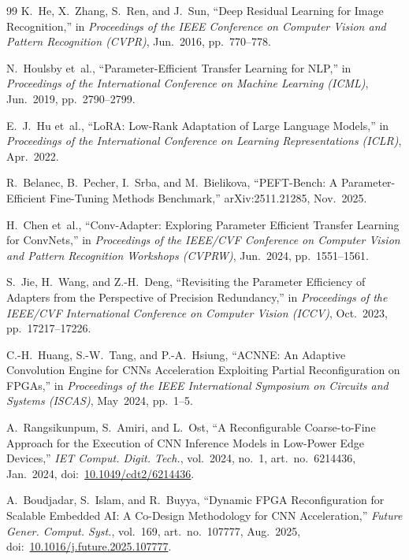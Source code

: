 \documentclass[12pt, a4paper]{report}
\numberwithin{equation}{chapter}
\numberwithin{figure}{chapter}
\numberwithin{table}{chapter}
\numberwithin{algorithm}{chapter}
\begin{document}
\begin{thebibliography}{99}
K.~He, X.~Zhang, S.~Ren, and J.~Sun,
``Deep Residual Learning for Image Recognition,''
in \emph{Proceedings of the IEEE Conference on Computer Vision and Pattern Recognition (CVPR)}, Jun.~2016, pp.~770--778.


N.~Houlsby et~al.,
``Parameter-Efficient Transfer Learning for NLP,''
in \emph{Proceedings of the International Conference on Machine Learning (ICML)}, Jun.~2019, pp.~2790--2799.


E.~J.~Hu et~al.,
``LoRA: Low-Rank Adaptation of Large Language Models,''
in \emph{Proceedings of the International Conference on Learning Representations (ICLR)}, Apr.~2022.


R.~Belanec, B.~Pecher, I.~Srba, and M.~Bielikova,
``PEFT-Bench: A Parameter-Efficient Fine-Tuning Methods Benchmark,''
arXiv:2511.21285, Nov.~2025.

H.~Chen et~al.,
``Conv-Adapter: Exploring Parameter Efficient Transfer Learning for ConvNets,''
in \emph{Proceedings of the IEEE/CVF Conference on Computer Vision and Pattern Recognition Workshops (CVPRW)}, Jun.~2024, pp.~1551--1561.

S.~Jie, H.~Wang, and Z.-H.~Deng,
``Revisiting the Parameter Efficiency of Adapters from the Perspective of Precision Redundancy,''
in \emph{Proceedings of the IEEE/CVF International Conference on Computer Vision (ICCV)}, Oct.~2023, pp.~17217--17226.

C.-H.~Huang, S.-W.~Tang, and P.-A.~Hsiung,
``ACNNE: An Adaptive Convolution Engine for CNNs Acceleration Exploiting Partial Reconfiguration on FPGAs,''
in \emph{Proceedings of the IEEE International Symposium on Circuits and Systems (ISCAS)}, May~2024, pp.~1--5.

A.~Rangsikunpum, S.~Amiri, and L.~Ost,
``A Reconfigurable Coarse-to-Fine Approach for the Execution of CNN Inference Models in Low-Power Edge Devices,''
\emph{IET Comput. Digit. Tech.}, vol.~2024, no.~1, art.~no.~6214436, Jan.~2024,
doi:~\url{10.1049/cdt2/6214436}.

A.~Boudjadar, S.~Islam, and R.~Buyya,
``Dynamic FPGA Reconfiguration for Scalable Embedded AI: A Co-Design Methodology for CNN Acceleration,''
\emph{Future Gener. Comput. Syst.}, vol.~169, art.~no.~107777, Aug.~2025,
doi:~\url{10.1016/j.future.2025.107777}.


\end{thebibliography}
\end{document}
